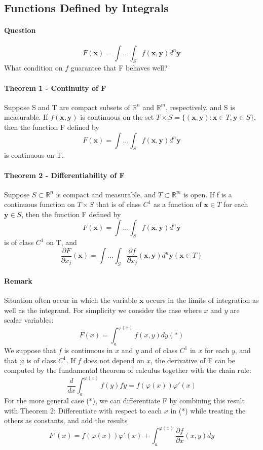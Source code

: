 \documentclass[11pt]{article}
\newcommand{\tb}[1]{\textbf{#1}}
\newcommand{\real}[0]{\mathbb{R}}
\newcommand{\vx}[0]{\tb{x}}
\newcommand{\vy}[0]{\tb{y}}
\begin{document}
\subsection{Functions Defined by Integrals}
\paragraph{Question}  $$ F(\vx) = \int\hdots\int_S f(\vx,\vy)d^n\vy$$ What condition on $f$ guarantee that F behaves well?
\paragraph{Theorem 1 - Continuity of F} Suppose S and T are compact subsets of $\real^n$ and $\real^m$, respectively, and S is measurable. If $f(\vx, \vy)$ is continuous on the set $T \times S = \{(\vx, \vy): \vx \in T, \vy \in S\}$, then the function F defined by $$ F(\vx) = \int\hdots\int_S f(\vx,\vy)d^n\vy$$ is continuous on T.
\paragraph{Theorem 2 - Differentiability of F} Suppose $S \subset \real^n$ is compact and measurable, and $T \subset \real^m$ is open. If f is a continuous function on $T \times S$ that is of class $C^1$ as a function of $\vx \in T$ for each $\vy \in S$, then the function F defined by $$ F(\vx) = \int\hdots\int_S f(\vx,\vy)d^n\vy$$ is of class $C^1$ on T, and 
    $$ \frac{\partial F}{\partial x_j}(\vx) = \int \hdots \int_S \frac{\partial f}{\partial x_j}(\vx, \vy) d^n\vy (\vx \in T)$$
\paragraph{Remark} Situation often occur in which the variable $\vx$ occurs in the limits of integration as well as the integrand. For simplicity we consider the case where $x$ and $y$ are scalar variables: $$F(x) = \int_a^{\varphi(x)} f(x,y)dy (*)$$
We suppose that $f$ is continuous in $x$ and $y$ and of class $C^1$ in $x$ for each $y$, and that $\varphi$ is of class $C^1$. If $f$ does not depend on $x$, the derivative of F can be computed by the fundamental theorem of calculus together with the chain rule:
$$\frac{d}{dx}\int_a^{\varphi(x)}f(y)fy = f(\varphi(x))\varphi'(x)$$
For the more general case (*), we can differentiate F by combining this result with Theorem 2: Differentiate with respect to each $x$ in (*) while treating the others as constants, and add the results
$$F'(x) = f(\varphi(x))\varphi'(x) + \int_a^{\varphi(x)}\frac{\partial f}{\partial x}(x,y) dy$$
\end{document}
